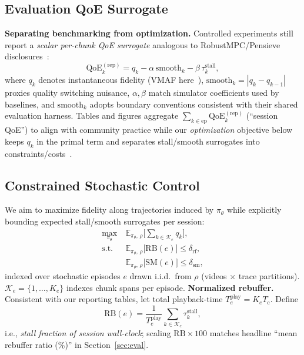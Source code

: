 \documentclass[preprint,12pt]{elsarticle}
\begin{document}
\subsection{Evaluation QoE Surrogate}

\textbf{Separating benchmarking from optimization.}
Controlled experiments still report a \emph{scalar per-chunk QoE surrogate} analogous to RobustMPC/Pensieve disclosures~\cite{yin2015control,mao2017neural}:
\begin{equation}
    \mathrm{QoE}^{\mathrm{(rep)}}_{k} = q_k - \alpha\, \mathrm{smooth}_k - \beta\, \tau^{\mathrm{stall}}_k,
\end{equation}
where \(q_k\) denotes instantaneous fidelity (VMAF here~\cite{li2016vmaf}), \(\mathrm{smooth}_k=| q_k-q_{k-1}| \) proxies quality switching nuisance, \(\alpha,\beta\) match simulator coefficients used by baselines, and \(\mathrm{smooth}_k\) adopts boundary conventions consistent with their shared evaluation harness.
Tables and figures aggregate \(\sum_{k\in\mathrm{ep}}\mathrm{QoE}^{\mathrm{(rep)}}_{k}\) (``session QoE'') to align with community practice while our \emph{optimization} objective below keeps \(q_k\) in the primal term and separates stall/smooth surrogates into constraints/costs~\cite{paternain2019dual}.

\subsection{Constrained Stochastic Control}

We aim to maximize fidelity along trajectories induced by \(\pi_\theta\) while explicitly bounding expected stall/smooth surrogates per session:
\begin{align}
\label{eq:prim}
    \max_{\pi_\theta} ~ & \mathbb{E}_{\pi_\theta,\,\rho}\Big[\sum_{k\in\mathcal{K}_{e}} q_k\Big],\\
\label{eq:c1}
    \mathrm{s.t.} ~~ & \mathbb{E}_{\pi_\theta,\,\rho}\Big[\mathrm{RB}(e)\Big] \le \delta_{\mathrm{rf}},\\
\label{eq:c2}
    & \mathbb{E}_{\pi_\theta,\,\rho}\Big[\mathrm{SM}(e)\Big] \le \delta_{\mathrm{sm}},
\end{align}
indexed over stochastic episodes \(e\) drawn i.i.d.\ from \(\rho\) (videos $\times$ trace partitions). \(\mathcal{K}_{e}=\{1,\ldots,K_{e}\}\) indexes chunk spans per episode.
\textbf{Normalized rebuffer.}
Consistent with our reporting tables, let total playback-time \(T^{\mathrm{play}}_{e}=K_{e}T_{\mathrm{c}}\). Define
\begin{equation}
    \mathrm{RB}(e)=\frac{1}{T^{\mathrm{play}}_{e}}\sum_{k\in\mathcal{K}_{e}} \tau^{\mathrm{stall}}_k,
\end{equation}
i.e., \emph{stall fraction of session wall-clock}; scaling \(\mathrm{RB}{\times}100\) matches headline ``mean rebuffer ratio (\%)'' in Section~\ref{sec:eval}.
\end{document}
